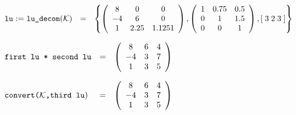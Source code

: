 \begin{flushleft}  
\hspace*{0.1in}
\begin{math}  
\begin{array}{cccc}
${\tt lu} := {\tt lu\_decom}$({\cal K}) & = & 
\left\{ 
        \left( \begin{array}{ccc} 8 & 0 & 0 \\ -4 & 6 & 0 \\ 1 & 2.25 & 
1.125 1 \end{array} \right), 
        \left( \begin{array}{ccc} 1 & 0.75 & 0.5 \\ 0 & 1 & 1.5 \\ 0 & 
0 & 1 \end{array} \right), 
	[\; 3 \; 2 \; 3 \; ]
\right\} 
\end{array}
\end{math}  
\end{flushleft}

\vspace*{0.1in}

\begin{flushleft}  
\hspace*{0.1in}
\begin{math}  
\begin{array}{ccc}
${\tt first lu * second lu}$ & = & 
        \left( \begin{array}{ccc} 8 & 6 & 4 \\ -4 & 3 & 7 \\ 1 & 3 & 5
 \end{array} \right) 
\end{array}
\end{math}  
\end{flushleft}

\begin{flushleft}  
\hspace*{0.1in}
\begin{math}  
\begin{array}{ccc}
${\tt convert(${\cal K}$,third lu}$) \hspace*{0.055in} & = & 
        \left( \begin{array}{ccc} 8 & 6 & 4 \\ -4 & 3 & 7 \\ 1 & 3 & 5
 \end{array} \right) 
\end{array}
\end{math}  
\end{flushleft}


